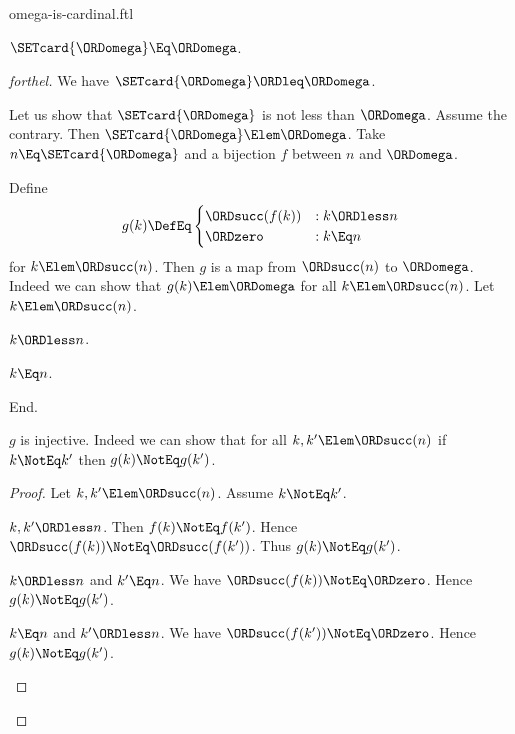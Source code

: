 \documentclass{stex}
\begin{document}
\begin{smodule}{omega-is-cardinal.ftl}

\begin{proposition}[forthel]
  $\SETcard{\ORDomega} \Eq \ORDomega$.
\end{proposition}
\begin{proof}[forthel]
  We have $\SETcard{\ORDomega} \ORDleq \ORDomega$.

  Let us show that $\SETcard{\ORDomega}$ is not less than $\ORDomega$.
    Assume the contrary.
    Then $\SETcard{\ORDomega} \Elem \ORDomega$.
    Take $n \Eq \SETcard{\ORDomega}$ and a bijection $f$ between $n$ and $\ORDomega$.

    Define \[ g(k) \DefEq
      \begin{cases}
        \ORDsucc(f(k)) & : k \ORDless n
        \\
        \ORDzero           & : k \Eq n
      \end{cases} \]
    for $k \Elem \ORDsucc(n)$.
    Then $g$ is a map from $\ORDsucc(n)$ to $\ORDomega$.
    Indeed we can show that $g(k) \Elem \ORDomega$ for all $k \Elem \ORDsucc(n)$.
      Let $k \Elem \ORDsucc(n)$.
      \begin{case}{$k \ORDless n$.} \end{case}
      \begin{case}{$k \Eq n$.} \end{case}
    End.

    $g$ is injective.
    Indeed we can show that for all $k, k' \Elem \ORDsucc(n)$ if $k \NotEq k'$
    then $g(k) \NotEq g(k')$. 
    \begin{proof}
      Let $k, k' \Elem \ORDsucc(n)$.
      Assume $k \NotEq k'$.

      \begin{case}{$k, k' \ORDless n$.}
        Then $f(k) \NotEq f(k')$.
        Hence $\ORDsucc(f(k)) \NotEq \ORDsucc(f(k'))$.
        Thus $g(k) \NotEq g(k')$.
      \end{case}

      \begin{case}{$k \ORDless n$ and $k' \Eq n$.}
        We have $\ORDsucc(f(k)) \NotEq \ORDzero$.
        Hence $g(k) \NotEq g(k')$.
      \end{case}

      \begin{case}{$k \Eq n$ and $k' \ORDless n$.}
        We have $\ORDsucc(f(k')) \NotEq \ORDzero$.
        Hence $g(k) \NotEq g(k')$.
      \end{case}
    \end{proof}


\end{proof}
\end{smodule}
\end{document}
